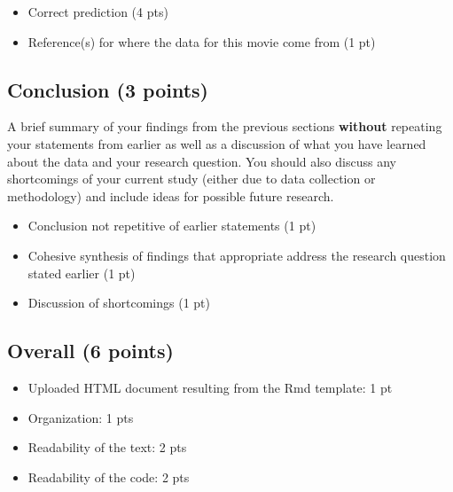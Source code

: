 \documentclass[
]{article}
\providecommand{\tightlist}{%
  \setlength{\itemsep}{0pt}\setlength{\parskip}{0pt}}
\begin{document}
\begin{itemize}
\tightlist
\item
  Correct prediction (4 pts)
\item
  Reference(s) for where the data for this movie come from (1 pt)
\end{itemize}

\hypertarget{conclusion-3-points}{%
\subsection{Conclusion (3 points)}\label{conclusion-3-points}}

A brief summary of your findings from the previous sections
\textbf{without} repeating your statements from earlier as well as a
discussion of what you have learned about the data and your research
question. You should also discuss any shortcomings of your current study
(either due to data collection or methodology) and include ideas for
possible future research.

\begin{itemize}
\tightlist
\item
  Conclusion not repetitive of earlier statements (1 pt)
\item
  Cohesive synthesis of findings that appropriate address the research
  question stated earlier (1 pt)
\item
  Discussion of shortcomings (1 pt)
\end{itemize}

\hypertarget{overall-6-points}{%
\subsection{Overall (6 points)}\label{overall-6-points}}

\begin{itemize}
\tightlist
\item
  Uploaded HTML document resulting from the Rmd template: 1 pt
\item
  Organization: 1 pts
\item
  Readability of the text: 2 pts
\item
  Readability of the code: 2 pts
\end{itemize}
\end{document}
